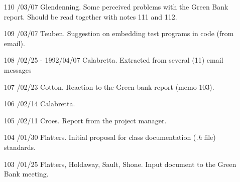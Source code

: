 \begin{enumerate}
\item[110]
/03/07 Glendenning.
\linebreak  Some perceived problems with the Green Bank report.  Should be read
   together with notes 111 and 112.

\item[109]
/03/07 Teuben.
\linebreak  Suggestion on embedding test programs in code (from email).

\item[108]
/02/25 - 1992/04/07 Calabretta.
\linebreak  Extracted from several (11) email messages

\item[107]
/02/23 Cotton.
\linebreak  Reaction to the Green bank report (memo 103).

\item[106]
/02/14 Calabretta.

\item[105]
/02/11 Croes.
\linebreak  Report from the project manager.

\item[104]
/01/30 Flatters.
\linebreak  Initial proposal for class documentation (\textsl{.h} file) standards.

\item[103]
/01/25 Flatters, Holdaway, Sault, Shone.
\linebreak  Input document to the Green Bank meeting.


\end{enumerate}
